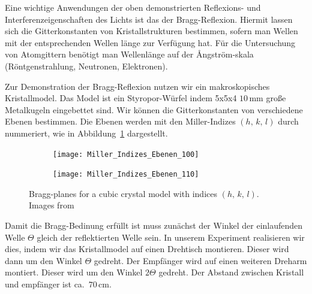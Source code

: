 \documentclass[a4paper,10pt,twocolumn]{article}
\begin{document}
    Eine wichtige Anwendungen der oben demonstrierten Reflexions- und Interferenzeigenschaften des Lichts ist das
    der Bragg-Reflexion.
    Hiermit lassen sich die Gitterkonstanten von Kristallstrukturen bestimmen, sofern man Wellen mit der
    entsprechenden Wellen länge zur Verfügung hat.
    Für die Untersuchung von Atomgittern benötigt man Wellenlänge auf der {\AA}ngström-skala (Röntgenstrahlung,
    Neutronen, Elektronen).
    
    Zur Demonstration der Bragg-Reflexion nutzen wir ein makroskopisches Kristallmodel.
    Das Model ist ein Styropor-Würfel indem 5x5x4 $10\,\mathrm{mm}$ große Metalkugeln eingebettet sind.
    Wir können die Gitterkonstanten von verschiedene Ebenen bestimmen.
    Die Ebenen werden mit den Miller-Indizes $(h,\,k,\,l)$ durch nummeriert, wie
    in Abbildung~\ref{fig:BraggPlanesIndices} dargestellt.
    
    \begin{figure}[htbp] %
        \centering
        \begin{subfigure}{0.49\linewidth}
            \centering
            \texttt{[image: Miller\_Indizes\_Ebenen\_100]}
        \end{subfigure}
        \begin{subfigure}{0.49\linewidth}
            \centering
            \texttt{[image: Miller\_Indizes\_Ebenen\_110]}
        \end{subfigure}
        \caption{Bragg-planes for a cubic crystal model with indices $(h,\,k,\,l)$.
        Images from ~\cite{miller}}
        \label{fig:BraggPlanesIndices}
    \end{figure}


    Damit die Bragg-Bedinung erfüllt ist muss zunächst der Winkel der einlaufenden Welle $\Theta$ gleich der 
    reflektierten Welle sein.
    In unserem Experiment realisieren wir dies, indem wir das Kristallmodel auf einen Drehtisch montieren.
    Dieser wird dann um den Winkel $\Theta$ gedreht.
    Der Empfänger wird auf einen weiteren Dreharm montiert.
    Dieser wird um den Winkel $2 \Theta$ gedreht.
    Der Abstand zwischen Kristall und empfänger ist ca.\ $70 \, \mathrm{cm}$.
    
\end{document}
